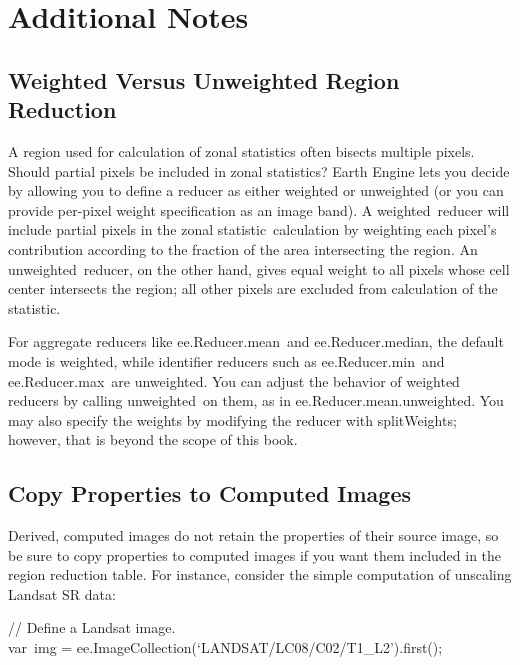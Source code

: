 \documentclass[
  letterpaper,
  DIV=11,
  numbers=noendperiod]{scrreprt}
\begin{document}
\hypertarget{additional-notes}{%
\section{Additional Notes}\label{additional-notes}}

\hypertarget{weighted-versus-unweighted-region-reduction}{%
\subsection{Weighted Versus Unweighted Region
Reduction}\label{weighted-versus-unweighted-region-reduction}}

A region used for calculation of zonal statistics often bisects multiple
pixels. Should partial pixels be included in zonal statistics? Earth
Engine lets you decide by allowing you to define a reducer as either
weighted or unweighted (or you can provide per-pixel weight
specification as an image band). A weighted~reducer will include partial
pixels in the zonal statistic~calculation by weighting each pixel's
contribution according to the fraction of the area intersecting the
region. An unweighted~reducer, on the other hand, gives equal weight to
all pixels whose cell center intersects the region; all other pixels are
excluded from calculation of the statistic.

For aggregate reducers like ee.Reducer.mean~and ee.Reducer.median, the
default mode is weighted, while identifier reducers such as
ee.Reducer.min~and ee.Reducer.max~are unweighted. You can adjust the
behavior of weighted reducers by calling unweighted~on them, as in
ee.Reducer.mean.unweighted. You may also specify the weights by
modifying the reducer with splitWeights; however, that is beyond the
scope of this book.

\hypertarget{copy-properties-to-computed-images}{%
\subsection{Copy Properties to Computed
Images}\label{copy-properties-to-computed-images}}

Derived, computed images do not retain the properties of their source
image, so be sure to copy properties to computed images if you want them
included in the region reduction table. For instance, consider the
simple computation of unscaling Landsat SR data:

// Define a Landsat image.\\
var~img = ee.ImageCollection(`LANDSAT/LC08/C02/T1\_L2').first();
\end{document}
